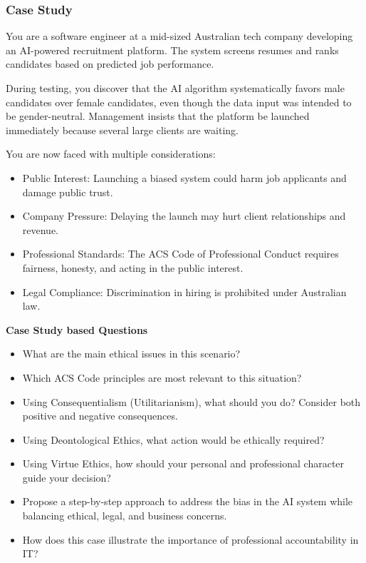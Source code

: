 \subsubsection{Case Study}

\indent 

You are a software engineer at a mid-sized Australian tech company developing an AI-powered recruitment platform. The system screens resumes and ranks candidates based on predicted job performance.

During testing, you discover that the AI algorithm systematically favors male candidates over female candidates, even though the data input was intended to be gender-neutral. Management insists that the platform be launched immediately because several large clients are waiting.

You are now faced with multiple considerations:

\begin{itemize}
    \item Public Interest: Launching a biased system could harm job applicants and damage public trust.
    \item Company Pressure: Delaying the launch may hurt client relationships and revenue.
    \item Professional Standards: The ACS Code of Professional Conduct requires fairness, honesty, and acting in the public interest.
    \item Legal Compliance: Discrimination in hiring is prohibited under Australian law.
\end{itemize}

\bigskip

\noindent\textbf{Case Study based Questions}

\begin{itemize}
    \item What are the main ethical issues in this scenario?
    \item Which ACS Code principles are most relevant to this situation?
    \item Using Consequentialism (Utilitarianism), what should you do? Consider both positive and negative consequences.
    \item Using Deontological Ethics, what action would be ethically required?
    \item Using Virtue Ethics, how should your personal and professional character guide your decision?
    \item Propose a step-by-step approach to address the bias in the AI system while balancing ethical, legal, and business concerns.
    \item How does this case illustrate the importance of professional accountability in IT?
\end{itemize}
